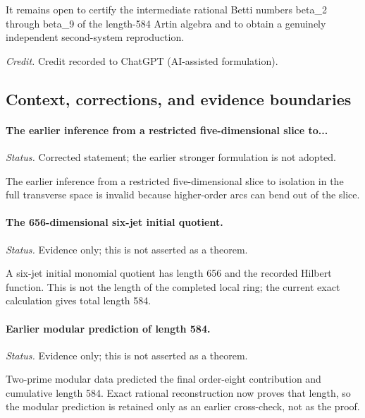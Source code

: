 It remains open to certify the intermediate rational Betti numbers beta\_2 through beta\_9 of the length-584 Artin algebra and to obtain a genuinely independent second-system reproduction.

\emph{Credit.} Credit recorded to ChatGPT (AI-assisted formulation).

\subsection{Context, corrections, and evidence boundaries}

\label{supp-note-03-015}
\paragraph{The earlier inference from a restricted five-dimensional slice to...}
\emph{Status.} Corrected statement; the earlier stronger formulation is not adopted.

The earlier inference from a restricted five-dimensional slice to isolation in the full transverse space is invalid because higher-order arcs can bend out of the slice.

\label{supp-note-03-016}
\paragraph{The 656-dimensional six-jet initial quotient.}
\emph{Status.} Evidence only; this is not asserted as a theorem.

A six-jet initial monomial quotient has length 656 and the recorded Hilbert function.  This is not the length of the completed local ring; the current exact calculation gives total length 584.

\label{supp-note-03-017}
\paragraph{Earlier modular prediction of length 584.}
\emph{Status.} Evidence only; this is not asserted as a theorem.

Two-prime modular data predicted the final order-eight contribution and cumulative length 584.  Exact rational reconstruction now proves that length, so the modular prediction is retained only as an earlier cross-check, not as the proof.

\endgroup
